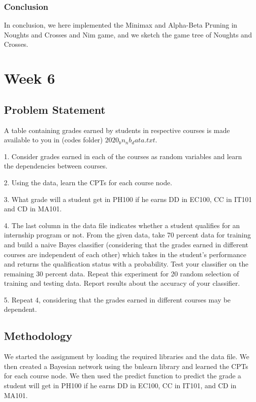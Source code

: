 \documentclass[15pt,journal]{IEEEtran}
\begin{document}
\subsubsection{\Large{\textbf{Conclusion}}\\}
In  conclusion, we here implemented the  Minimax and Alpha-Beta Pruning in Noughts and Crosses and Nim game, and we sketch the game tree of Noughts and Crosses.

\section{Week 6}

\subsection{Problem Statement}
A table containing grades earned by students in respective courses is made available to you in (codes folder) $2020_bn_nb_data.txt$. 

1. Consider grades earned in each of the courses as random variables and learn the dependencies between courses. 

2. Using the data, learn the CPTs for each course node.

3. What grade will a student get in PH100 if he earns DD in EC100, CC in IT101 and CD in MA101.

4. The last column in the data file indicates whether a student qualifies for an internship program or not. From the given data, take 70 percent data for training and build a naive Bayes classifier (considering that the grades earned in different courses are independent of each other) which takes in the student’s performance and returns the qualification status with a probability. Test your classifier on the remaining 30 percent data. Repeat this experiment for 20 random selection of training and testing data. Report results about the accuracy of your classifier.

5. Repeat 4, considering that the grades earned in different courses may be dependent.
\subsection{Methodology}
\cite{bayesian}
We started the assignment by loading the required libraries and the data file. We then created a Bayesian network using the bnlearn library and learned the CPTs for each course node. We then used the predict function to predict the grade a student will get in PH100 if he earns DD in EC100, CC in IT101, and CD in MA101.
\end{document}
